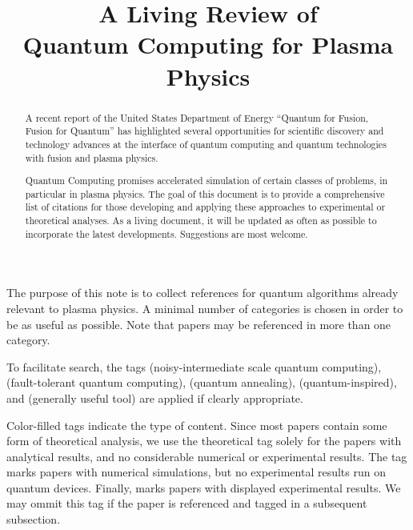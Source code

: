 \documentclass[12pt,letterpaper]{article}
\title{A Living Review of  \\  Quantum Computing for Plasma Physics}
\author{}
\date{}
\let\oldmaketitle\maketitle
\renewcommand\maketitle{{\bfseries\boldmath\oldmaketitle}}
\begin{document}
\maketitle


\begin{abstract}

	A recent report of the United States Department of Energy “Quantum for Fusion, Fusion for Quantum” has highlighted several opportunities for scientific discovery and technology advances at the interface of quantum computing and quantum technologies with fusion and plasma physics.


	Quantum Computing promises accelerated simulation of certain classes of problems, in particular in plasma physics. The goal of this document is to provide a comprehensive list of citations for those developing and applying these approaches to experimental or theoretical analyses.  As a living document, it will be updated as often as possible to incorporate the latest developments.  Suggestions are most welcome.

\end{abstract}

\newpage

The purpose of this note is to collect references for quantum algorithms already relevant to plasma physics.  A minimal number of categories is chosen in order to be as useful as possible. Note that papers may be referenced in more than one category.

To facilitate search, the tags  (noisy-intermediate scale quantum computing),  (fault-tolerant quantum computing),  (quantum annealing),  (quantum-inspired), and  (generally useful tool) are applied if clearly appropriate.

Color-filled tags indicate the type of content. Since most papers contain some form of theoretical analysis, we use the theoretical tag  solely for the papers with analytical results, and no considerable numerical or experimental results. The tag  marks papers with numerical simulations, but no experimental results run on quantum devices. Finally,  marks papers with displayed experimental results. We may ommit this tag if the paper is referenced and tagged in a subsequent subsection.
\end{document}
